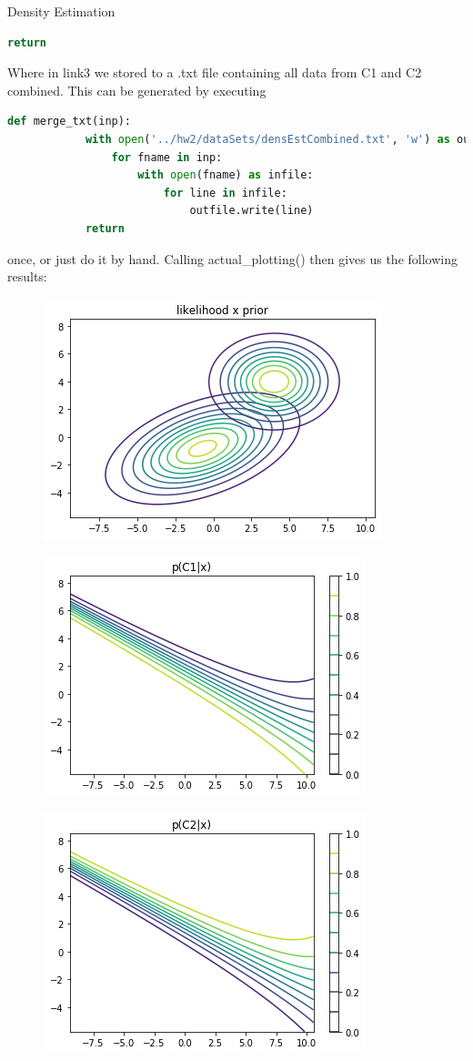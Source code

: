 \documentclass[
ngerman,
]{tudaexercise}
\begin{document}
\begin{task}{Density Estimation}
\begin{subtask}
\begin{lstlisting}[language=Python]
			return
	\end{lstlisting}
	Where in link3 we stored to a .txt file containing all data from C1 and C2 combined. This can be generated by executing
	\begin{lstlisting}[language=Python]
		def merge_txt(inp):
			with open('../hw2/dataSets/densEstCombined.txt', 'w') as outfile:
				for fname in inp:
					with open(fname) as infile:
						for line in infile:
							outfile.write(line)
			return
	\end{lstlisting}
	once, or just do it by hand. Calling actual\_plotting() then gives us the following results:
	\begin{figure}[H]
		\includegraphics{likexprior.png}
	\end{figure}
\begin{figure}[H]
		\includegraphics{pc1x.png}
\end{figure}
\begin{figure}[H]
	\includegraphics{pc2x.png}

\end{figure}
\end{subtask}
\end{task}
\end{document}
